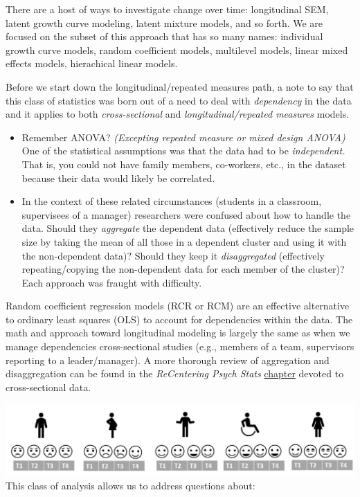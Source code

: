 \documentclass[
  11pt,
]{book}
\providecommand{\tightlist}{%
  \setlength{\itemsep}{0pt}\setlength{\parskip}{0pt}}
\begin{document}
There are a host of ways to investigate change over time: longitudinal SEM, latent growth curve modeling, latent mixture models, and so forth. We are focused on the subset of this approach that has so many names: individual growth curve models, random coefficient models, multilevel models, linear mixed effects models, hierachical linear models.

Before we start down the longitudinal/repeated measures path, a note to say that this class of statistics was born out of a need to deal with \emph{dependency} in the data and it applies to both \emph{cross-sectional} and \emph{longitudinal/repeated measures} models.

\begin{itemize}
\tightlist
\item
  Remember ANOVA? \emph{(Excepting repeated measure or mixed design ANOVA)} One of the statistical assumptions was that the data had to be \emph{independent.} That is, you could not have family members, co-workers, etc., in the dataset because their data would likely be correlated.
\item
  In the context of these related circumstances (students in a classroom, supervisees of a manager) researchers were confused about how to handle the data. Should they \emph{aggregate} the dependent data (effectively reduce the sample size by taking the mean of all those in a dependent cluster and using it with the non-dependent data)? Should they keep it \emph{disaggregated} (effectively repeating/copying the non-dependent data for each member of the cluster)? Each approach was fraught with difficulty.
\end{itemize}

Random coefficient regression models (RCR or RCM) are an effective alternative to ordinary least squares (OLS) to account for dependencies within the data. The math and approach toward longitudinal modeling is largely the same as when we manage dependencies cross-sectional studies (e.g., members of a team, supervisors reporting to a leader/manager). A more thorough review of aggregation and disaggregation can be found in the \emph{ReCentering Psych Stats} \protect\hyperlink{wGroups}{chapter} devoted to cross-sectional data.

\includegraphics{images/LongExpl/LongNesting.jpg}
This class of analysis allows us to address questions about:
\end{document}
